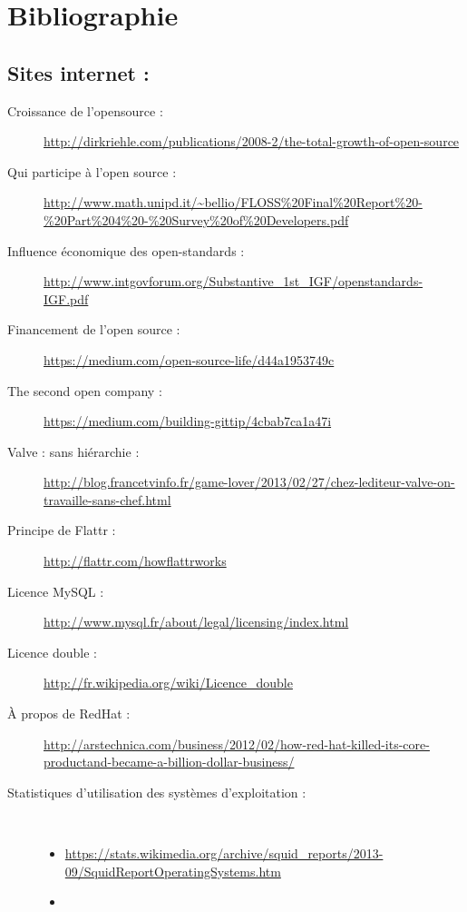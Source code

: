 \chapter*{Bibliographie}

{
\sloppy
\section*{Sites internet :\\}

\begin{description}
    \item[Croissance de l'opensource :]
        \url{http://dirkriehle.com/publications/2008-2/the-total-growth-of-open-source}

    \item[Qui participe à l'open source :]
        \url{http://www.math.unipd.it/~bellio/FLOSS%20Final%20Report%20-%20Part%204%20-%20Survey%20of%20Developers.pdf}
    \item[Influence économique des open-standards :]
        \url{http://www.intgovforum.org/Substantive_1st_IGF/openstandards-IGF.pdf}
    \item[Financement de l'open source :]
        \url{https://medium.com/open-source-life/d44a1953749c}
    \item[The second open company :]
        \url{https://medium.com/building-gittip/4cbab7ca1a47i}
    \item[Valve : sans hiérarchie :]
        \url{http://blog.francetvinfo.fr/game-lover/2013/02/27/chez-lediteur-valve-on-travaille-sans-chef.html}
    \item[Principe de Flattr :] \url{http://flattr.com/howflattrworks}
    \item[Licence MySQL :]
        \url{http://www.mysql.fr/about/legal/licensing/index.html}
    \item[Licence double :] \url{http://fr.wikipedia.org/wiki/Licence_double}
    \item[À propos de RedHat :]
        \url{http://arstechnica.com/business/2012/02/how-red-hat-killed-its-core-productand-became-a-billion-dollar-business/}
    \item[Statistiques d'utilisation des systèmes d'exploitation :]\
        \begin{itemize}[label=\textbullet]
            \item \url{https://stats.wikimedia.org/archive/squid_reports/2013-09/SquidReportOperatingSystems.htm}
            \item

\end{itemize}
\end{description}}
